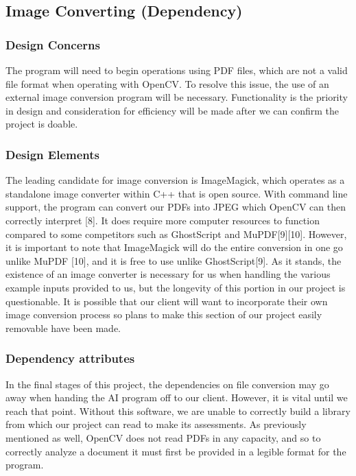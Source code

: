 \documentclass[onecolumn, draftclsnofoot,10pt, compsoc]{IEEEtran}
\begin{document}
\subsection{Image Converting (Dependency)}
\subsubsection{Design Concerns}
The program will need to begin operations using PDF files, which are not a valid file format when operating with OpenCV. To resolve this issue, the use of an external image conversion program will be necessary. Functionality is the priority in design and consideration for efficiency will be made after we can confirm the project is doable. 

\subsubsection{Design Elements}
The leading candidate for image conversion is ImageMagick, which operates as a standalone image converter within C++ that is open source. With command line support, the program can convert our PDFs into JPEG which OpenCV can then correctly interpret [8]. It does require more computer resources to function compared to some competitors such as GhostScript and MuPDF[9][10]. However, it is important to note that ImageMagick will do the entire conversion in one go unlike MuPDF [10], and it is free to use unlike GhostScript[9]. As it stands, the existence of an image converter is necessary for us when handling the various example inputs provided to us, but the longevity of this portion in our project is questionable. It is possible that our client will want to incorporate their own image conversion process so plans to make this section of our project easily removable have been made.

\subsubsection{Dependency attributes}
In the final stages of this project, the dependencies on file conversion may go away when handing the AI program off to our client. However, it is vital until we reach that point. Without this software, we are unable to correctly build a library from which our project can read to make its assessments. As previously mentioned as well, OpenCV does not read PDFs in any capacity, and so to correctly analyze a document it must first be provided in a legible format for the program.
\end{document}
